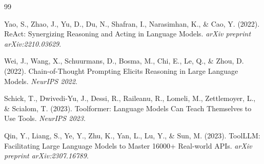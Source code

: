 \documentclass{article}
\begin{document}

\begin{thebibliography}{99}

Yao, S., Zhao, J., Yu, D., Du, N., Shafran, I., Narasimhan, K., \& Cao, Y. (2022).
\newblock ReAct: Synergizing Reasoning and Acting in Language Models.
\newblock \textit{arXiv preprint arXiv:2210.03629}.

Wei, J., Wang, X., Schuurmans, D., Bosma, M., Chi, E., Le, Q., \& Zhou, D. (2022).
\newblock Chain-of-Thought Prompting Elicits Reasoning in Large Language Models.
\newblock \textit{NeurIPS 2022}.

Schick, T., Dwivedi-Yu, J., Dessi, R., Raileanu, R., Lomeli, M., Zettlemoyer, L., \& Scialom, T. (2023).
\newblock Toolformer: Language Models Can Teach Themselves to Use Tools.
\newblock \textit{NeurIPS 2023}.

Qin, Y., Liang, S., Ye, Y., Zhu, K., Yan, L., Lu, Y., \& Sun, M. (2023).
\newblock ToolLLM: Facilitating Large Language Models to Master 16000+ Real-world APIs.
\newblock \textit{arXiv preprint arXiv:2307.16789}.

\end{thebibliography}
\end{document}
